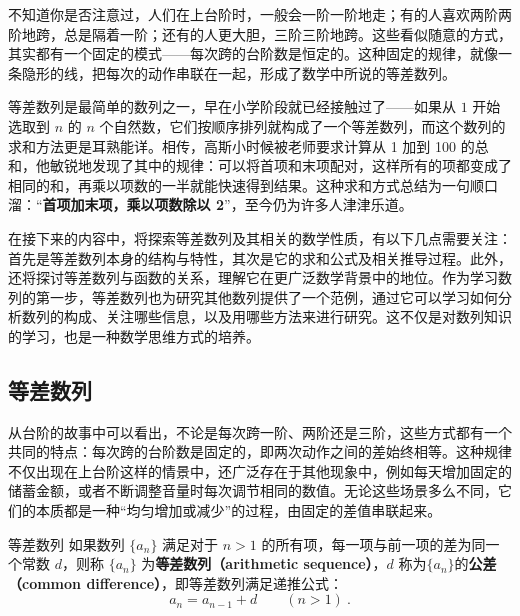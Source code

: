 

不知道你是否注意过，人们在上台阶时，一般会一阶一阶地走；有的人喜欢两阶两阶地跨，总是隔着一阶；还有的人更大胆，三阶三阶地跨。这些看似随意的方式，其实都有一个固定的模式——每次跨的台阶数是恒定的。这种固定的规律，就像一条隐形的线，把每次的动作串联在一起，形成了数学中所说的等差数列。

等差数列是最简单的数列之一，早在小学阶段就已经接触过了——如果从 $1$ 开始选取到  $n$  的  $n$  个自然数，它们按顺序排列就构成了一个等差数列，而这个数列的求和方法更是耳熟能详。相传，高斯小时候被老师要求计算从 1 加到 100 的总和，他敏锐地发现了其中的规律：可以将首项和末项配对，这样所有的项都变成了相同的和，再乘以项数的一半就能快速得到结果。这种求和方式总结为一句顺口溜：“\textbf{首项加末项，乘以项数除以 2}”，至今仍为许多人津津乐道。

在接下来的内容中，将探索等差数列及其相关的数学性质，有以下几点需要关注：首先是等差数列本身的结构与特性，其次是它的求和公式及相关推导过程。此外，还将探讨等差数列与函数的关系，理解它在更广泛数学背景中的地位。作为学习数列的第一步，等差数列也为研究其他数列提供了一个范例，通过它可以学习如何分析数列的构成、关注哪些信息，以及用哪些方法来进行研究。这不仅是对数列知识的学习，也是一种数学思维方式的培养。

\subsection{等差数列}\label{sub_HsAmPg_1}

从台阶的故事中可以看出，不论是每次跨一阶、两阶还是三阶，这些方式都有一个共同的特点：每次跨的台阶数是固定的，即两次动作之间的差始终相等。这种规律不仅出现在上台阶这样的情景中，还广泛存在于其他现象中，例如每天增加固定的储蓄金额，或者不断调整音量时每次调节相同的数值。无论这些场景多么不同，它们的本质都是一种“均匀增加或减少”的过程，由固定的差值串联起来。

\begin{definition}{等差数列}\label{def_HsAmPg_1}
如果数列 $\{a_n\}$ 满足对于 $n > 1$ 的所有项，每一项与前一项的差为同一个常数 $d$，则称 $\{a_n\}$ 为\textbf{等差数列（arithmetic sequence）}，$d$ 称为$\{a_n\}$的\textbf{公差（common difference）}，即等差数列满足递推公式：
\begin{equation}
a_{n}=a_{n-1}+d\qquad(n>1)~.
\end{equation}
\end{definition}

